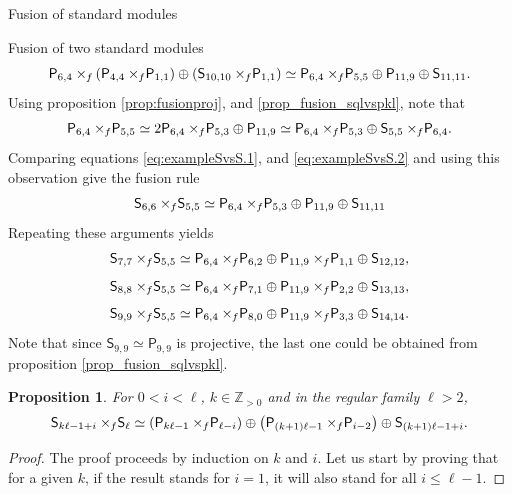\documentclass[reqno]{amsart}
\newtheorem{Prop}[Thm]{Proposition}
\newcommand{\ds}[1]{\mathsf S_{#1}}
\newcommand{\dP}[1]{\mathsf P_{#1}}
\newcommand{\xf}{\times\hspace{-0.27em}_f}
\newcommand{\lc}{\ell}
\begin{document}
\begin{section}{Fusion of standard modules}
\begin{subsection}{Fusion of two standard modules}
\begin{equation}
	\dP{6,4}\xf \left( \dP{4,4} \xf \dP{1,1}\right) \oplus \left(\ds{10,10}\xf \dP{1,1} \right) \simeq \dP{6,4} \xf \dP{5,5} \oplus \dP{11,9} \oplus \ds{11,11}.
\end{equation}
Using proposition \ref{prop:fusionproj}, and \ref{prop_fusion_sqlvspkl}, note that
\begin{equation*}
	\dP{6,4} \xf \dP{5,5} \simeq 2 \dP{6,4} \xf \dP{5,3} \oplus \dP{11,9} \simeq \dP{6,4} \xf \dP{5,3} \oplus \ds{5,5}\xf \dP{6,4}. 
\end{equation*}
Comparing equations \eqref{eq:exampleSvsS.1}, and \eqref{eq:exampleSvsS.2} and using this observation give the fusion rule
\begin{equation}
	\ds{6,6}\xf \ds{5,5} \simeq \dP{6,4} \xf \dP{5,3} \oplus \dP{11,9} \oplus \ds{11,11}
\end{equation} 
Repeating these arguments yields
\begin{equation}
\ds{7,7} \xf \ds{5,5} \simeq \dP{6,4} \xf \dP{6,2} \oplus \dP{11,9}\xf \dP{1,1} \oplus \ds{12,12}\text{,}
\end{equation}
\begin{equation}
\ds{8,8} \xf \ds{5,5} \simeq \dP{6,4} \xf \dP{7,1} \oplus \dP{11,9}\xf \dP{2,2} \oplus \ds{13,13}\text{,}
\end{equation}
\begin{equation}
\ds{9,9} \xf \ds{5,5} \simeq \dP{6,4} \xf \dP{8,0} \oplus \dP{11,9}\xf \dP{3,3} \oplus \ds{14,14}\text{.}
\end{equation}
Note that since $\ds{9,9} \simeq \dP{9,9}$ is projective, the last one could be obtained from proposition \ref{prop_fusion_sqlvspkl}. 
\begin{Prop}\label{prop:fusionstandvssl}
For $0 < i < \lc$, $k \in \mathbb{Z}_{>0}$ and in the regular family  $\lc > 2$,
\begin{equation}\label{eq:fusionstandvssl}
\ds{k \lc -1 +i} \xf \ds{\lc} \simeq \left(\dP{k \lc -1} \xf \dP{\lc -i}\right) \oplus \left(\dP{(k+1)\lc -1} \xf \dP{i - 2}\right) \oplus \ds{(k+1)\lc -1+i}.
\end{equation}
\end{Prop}
\begin{proof}
The proof proceeds by induction on $k$ and $i$. Let us start by proving that for a given $k$, if the result stands for $i=1$, it will also stand for all $i \leq \lc -1 $. 


\end{proof}
\end{subsection}
\end{section}
\end{document}
